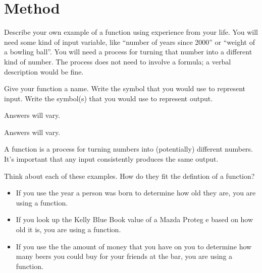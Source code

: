 \section{Method}\label{secondsection}
%
\begin{problem}
Describe your own example of a function using experience from your life. You will need some 
                    kind of input variable, like ``number of years since 2000'' or ``weight of a bowling ball''. You will 
				need a process for turning that number into a different kind of number. The process does not need to
                		involve a formula; a verbal description would be fine.
%
\par Give your function a name. Write the symbol that you would use to represent
                		input. Write the symbol(s) that you would use to represent output.
%
\begin{longsolution}
%
Answers will vary.
%
\end{longsolution}
%
\begin{shortsolution}
%
Answers will vary.
%
\end{shortsolution}
%
\end{problem}
%
\begin{definition}[Function]
A function is a process for turning numbers into (potentially) different numbers. 
			It's important that any input consistently produces the same output.\end{definition}
%
\begin{example}
Think about each of these examples. How do they fit the defintion of a function?
%
\begin{itemize}
\item If you use the year a person was born to determine how old they are, you are using a function.%
\item If you look up the Kelly Blue Book value of a Mazda Proteg\'{ e} based on how old it is, 
				you are using a function.%
\item If you use the the amount of money that you have on you to determine how many beers you could buy for 
				your friends at the bar, you are using a function.%
\end{itemize}
%
\end{example}
%
